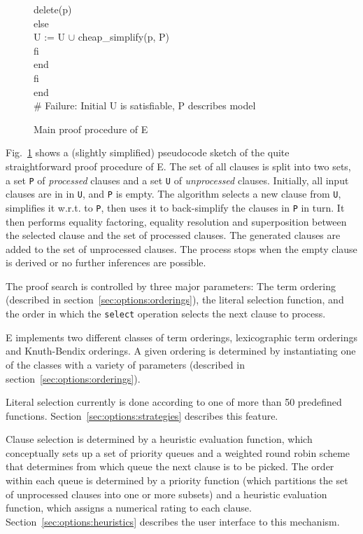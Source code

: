 \documentclass{article}
\begin{document}
\begin{figure}[hp]
\begin{center}
\begin{tabbing}
              delete(p)\-\\
            else\+\\
               U := U $\cup$ cheap\_simplify(p, P)\-\\
            fi\-\\
          end\-\\
        fi\-\\        
      end\\
      \# Failure: Initial U is satisfiable, P describes model
    \end{tabbing}
    \normalfont
    \caption{Main proof procedure of E}
    \label{fig:procedure}
  \end{center}
\end{figure}

Fig.~\ref{fig:procedure} shows a (slightly simplified) pseudocode
sketch of the quite straightforward proof procedure of E. The set of
all clauses is split into two sets, a set \texttt{P} of
\emph{processed} clauses and a set \texttt{U} of \emph{unprocessed}
clauses. Initially, all input clauses are in in \texttt{U}, and
\texttt{P} is empty. The algorithm selects a new clause from
\texttt{U}, simplifies it w.r.t. to \texttt{P}, then uses it to
back-simplify the clauses in \texttt{P} in turn. It then performs
equality factoring, equality resolution and superposition between the
selected clause and the set of processed clauses. The generated
clauses are added to the set of unprocessed clauses. The process stops
when the empty clause is derived or no further inferences are
possible.

The proof search is controlled by three major parameters: The term
ordering (described in section~\ref{sec:options:orderings}), the
literal selection function, and the order in which the \texttt{select}
operation selects the next clause to process. 

E implements two different classes of term orderings, lexicographic
term orderings and Knuth-Bendix orderings. A given ordering is
determined by instantiating one of the classes with a variety of
parameters (described in section~\ref{sec:options:orderings}).

Literal selection currently is done according to one of more than 50
predefined functions. Section~\ref{sec:options:strategies} describes
this feature.

Clause selection is determined by a heuristic evaluation function,
which conceptually sets up a set of priority queues and a weighted
round robin scheme that determines from which queue the next clause is
to be picked. The order within each queue is determined by a priority
function (which partitions the set of unprocessed clauses into one or
more subsets) and a heuristic evaluation function, which assigns a
numerical rating to each clause.  Section~\ref{sec:options:heuristics}
describes the user interface to this mechanism.
\end{document}
